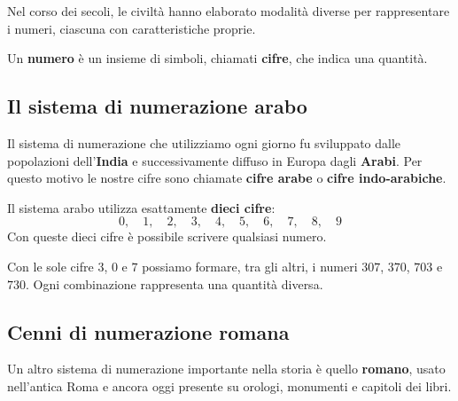 \medskip

Nel corso dei secoli, le civiltà hanno elaborato modalità diverse
per rappresentare i numeri, ciascuna con caratteristiche proprie.

\begin{definizione}
  Un \textbf{numero} è un insieme di simboli, chiamati \textbf{cifre},
  che indica una quantità.
\end{definizione}

\subsection{Il sistema di numerazione arabo}

Il sistema di numerazione che utilizziamo ogni giorno fu sviluppato
dalle popolazioni dell'\textbf{India} e successivamente diffuso in Europa
dagli \textbf{Arabi}.
Per questo motivo le nostre cifre sono chiamate \textbf{cifre arabe}
o \textbf{cifre indo-arabiche}.

\begin{regola}
  Il sistema arabo utilizza esattamente \textbf{dieci cifre}:
  \[
    0,\quad 1,\quad 2,\quad 3,\quad 4,\quad 5,\quad 6,\quad 7,\quad 8,\quad 9
  \]
  Con queste dieci cifre è possibile scrivere qualsiasi numero.
\end{regola}

\begin{esempio}
  Con le sole cifre $3$, $0$ e $7$ possiamo formare, tra gli altri,
  i numeri $307$, $370$, $703$ e $730$.
  Ogni combinazione rappresenta una quantità diversa.
\end{esempio}

\subsection{Cenni di numerazione romana}

Un altro sistema di numerazione importante nella storia è quello \textbf{romano},
usato nell'antica Roma e ancora oggi presente su orologi, monumenti e capitoli dei libri.

